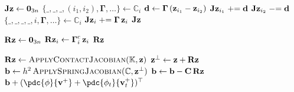 \begin{algorithm}[H]
\caption{Apply the spring (elastic) Jacobian to a vector.}
\label{alg:PD_apply_spring_jacobian}
\begin{algorithmic}[1]
\addtolength{\itemsep}{0.5ex}
    \State $\mathbf{J}\mathbf{z} \gets \mathbf{0}_{3n}$
            \State $\{\_, \_, \_, (i_1, i_2), \boldsymbol{\Gamma}, \dots\} \gets \mathbb{C}_i$
            \State $\mathbf{d} \gets \boldsymbol{\Gamma}\,(\mathbf{z}_{i_1} - \mathbf{z}_{i_2})$
            \State $\mathbf{J}\mathbf{z}_{i_1} \mathrel{+}= \mathbf{d}$
            \State $\mathbf{J}\mathbf{z}_{i_2} \mathrel{-}= \mathbf{d}$
            \State $\{\_, \_, \_, \_, i, \boldsymbol{\Gamma},\dots\} \gets \mathbb{C}_i$
            \State $\mathbf{J}\mathbf{z}_{i} \mathrel{+}= \boldsymbol{\Gamma}\,\mathbf{z}_{i}$
        \EndIf
    \EndFor
    \State \Return $\mathbf{J}\mathbf{z}$
\EndFunction
\end{algorithmic}
\end{algorithm}



\begin{algorithm}[H]
\caption{Apply the contact Jacobian to a vector.}
\label{alg:PD_apply_contact_jacobian}
\begin{algorithmic}[1]
\addtolength{\itemsep}{0.5ex}
    \State $\mathbf{R}\mathbf{z} \gets \mathbf{0}_{3n}$
        \State $\mathbf{R}\mathbf{z}_{i} \gets \boldsymbol{\Gamma}^{\text{c}}_i\,\mathbf{z}_i$
    \EndFor
    \State \Return $\mathbf{R}\mathbf{z}$
\EndFunction
\end{algorithmic}
\end{algorithm}

\begin{algorithm}[H]
\caption{Backward RHS vector assembly with contact.}
\label{alg:PD_backward_rhs}
\begin{algorithmic}[1]
\addtolength{\itemsep}{0.5ex}

\Statex
{}
    \State $\mathbf{R}\mathbf{z} \gets \textsc{ApplyContactJacobian}(\mathbb{K}, \mathbf{z})$ \graycomment{$\R^\top\z$}
    \State $\mathbf{z}^{\perp} \gets \mathbf{z} + \mathbf{R}\mathbf{z}$ \graycomment{$ = (\I+\R)^\top\z$}
    \State $\mathbf{b} \gets h^2\,\textsc{ApplySpringJacobian}(\mathbb{C}, \mathbf{z}^\perp)$ \graycomment{$=\Delta \LL\,(\I+\R)^\top\z$}
    \State $\mathbf{b} \gets \mathbf{b} - \mathbf{C}\,\mathbf{R}\mathbf{z}$
    \State \Return $\bb + (\pdc{\phi}{\vv^+} + \pdc{\phi_t}{\vv^+_t})^\top$ \graycomment{$ = (\,\Delta\LL\,(\I+\R)^\top - \C\,\R^\top)\,\z + (\pdc{\phi}{\vv^+})^\top$}
\EndFunction
\end{algorithmic}
\end{algorithm}

